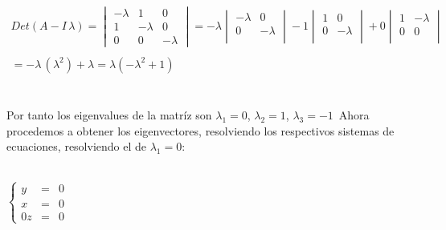 \documentclass[11pt,letterpaper]{article}
\begin{document}
    \,\\
    \begin{align*}
        Det(A-I\,\lambda)=
            \begin{vmatrix}
                -\lambda & 1 & 0\\
                1& -\lambda & 0\\
                0& 0 & -\lambda
            \end{vmatrix}=-\lambda
            \begin{vmatrix}
                -\lambda & 0 \\
                0 & -\lambda \\
                \end{vmatrix}
                -1
                \begin{vmatrix}
                1 & 0 \\
                0& -\lambda \\
                \end{vmatrix}
                +0
                  \begin{vmatrix}
                1 & -\lambda \\
                0 & 0\\
                \end{vmatrix}\,\\
                \,\\
                =-\lambda\,(\lambda^2)+\lambda=\lambda(-\lambda^2+1)
    \end{align*}\,\\
    \,\\
    Por tanto los eigenvalues de la matr\'iz son $\lambda_1=0$, $\lambda_2=1$, $\lambda_3=-1$\,
    Ahora procedemos a obtener los eigenvectores, resolviendo los respectivos sistemas de ecuaciones, resolviendo
    el de $\lambda_1=0$:\,\\
    \,\\
   
    \begin{center}
       $\left\{ 
         \begin{array}{rcl}
            y&=&0\\
            x&=&0\\
            0z&=&0
         \end{array}
       \right.$
        \end{center}
    
\end{document}
